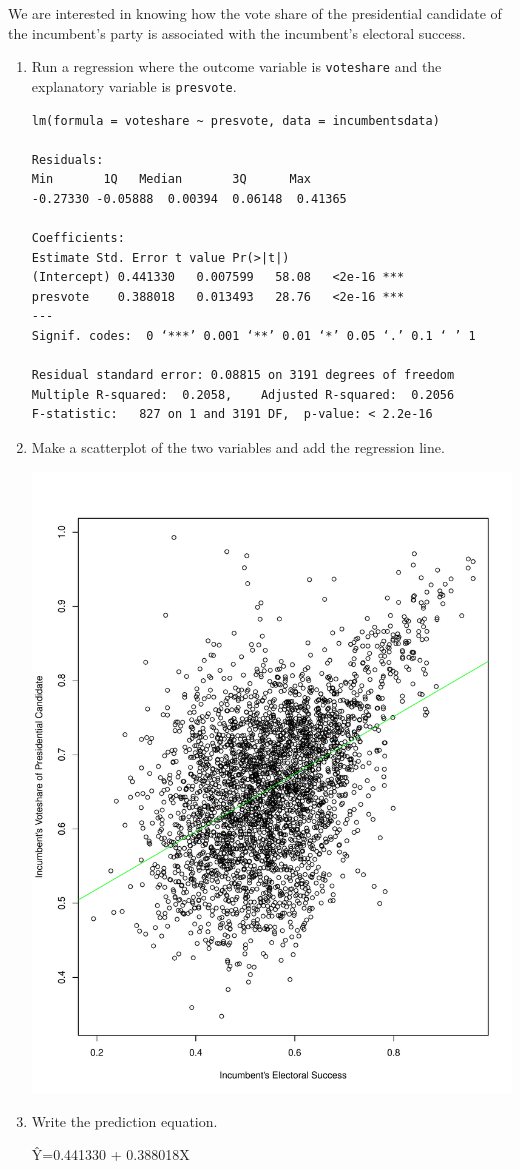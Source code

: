 \documentclass[12pt,letterpaper]{article}
\begin{document}
\noindent We are interested in knowing how the vote share of the presidential candidate of the incumbent's party is associated with the incumbent's electoral success.
	\vspace{.25cm}
	\begin{enumerate}
		\item Run a regression where the outcome variable is \texttt{voteshare} and the explanatory variable is \texttt{presvote}.
		
		\begin{Verbatim}
lm(formula = voteshare ~ presvote, data = incumbentsdata)

Residuals:
Min       1Q   Median       3Q      Max 
-0.27330 -0.05888  0.00394  0.06148  0.41365 

Coefficients:
Estimate Std. Error t value Pr(>|t|)    
(Intercept) 0.441330   0.007599   58.08   <2e-16 ***
presvote    0.388018   0.013493   28.76   <2e-16 ***
---
Signif. codes:  0 ‘***’ 0.001 ‘**’ 0.01 ‘*’ 0.05 ‘.’ 0.1 ‘ ’ 1

Residual standard error: 0.08815 on 3191 degrees of freedom
Multiple R-squared:  0.2058,	Adjusted R-squared:  0.2056 
F-statistic:   827 on 1 and 3191 DF,  p-value: < 2.2e-16
		\end{Verbatim}
		\item Make a scatterplot of the two variables and add the regression line. 
		
		\includegraphics[scale=0.6]{Question 3.2.pdf}
		\item Write the prediction equation.
		
		\^{Y}=0.441330 + 0.388018X
	\end{enumerate}
	
\end{document}
